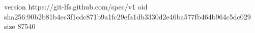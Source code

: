 version https://git-lfs.github.com/spec/v1
oid sha256:90b2b81b4ec3f1cdc871b9a1fc29efa1db3330d2e46ba577fb464b964c5dc029
size 87540
